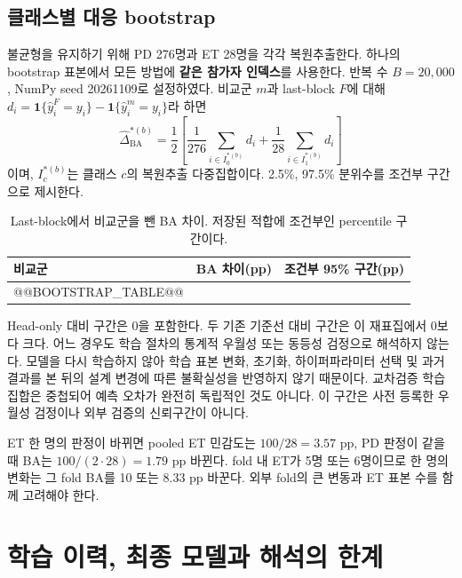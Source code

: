 \documentclass[11pt,a4paper]{article}
\newcommand{\ind}{\mathbf{1}}
\DeclareMathOperator{\BA}{BA}
\begin{document}
\subsection{클래스별 대응 bootstrap}
불균형을 유지하기 위해 PD 276명과 ET 28명을 각각 복원추출한다.
하나의 bootstrap 표본에서 모든 방법에 \textbf{같은 참가자 인덱스}를 사용한다.
반복 수 $B=20{,}000$, NumPy seed 20261109로 설정하였다.
비교군 $m$과 last-block $F$에 대해
$d_i=\ind\{\widehat y_i^{F}=y_i\}-\ind\{\widehat y_i^m=y_i\}$라 하면
\begin{equation}
 \widehat\Delta_{\BA}^{*(b)}=
 \frac12\left[\frac1{276}\sum_{i\in I_{0}^{*(b)}}d_i+
 \frac1{28}\sum_{i\in I_{1}^{*(b)}}d_i\right]
\end{equation}
이며, $I_c^{*(b)}$는 클래스 $c$의 복원추출 다중집합이다.
2.5\%, 97.5\% 분위수를 조건부 구간으로 제시한다.
\begin{table}[H]\centering\small
\caption{Last-block에서 비교군을 뺀 BA 차이. 저장된 적합에 조건부인 percentile 구간이다.}
\begin{tabular}{@{}lrr@{}}\toprule
비교군 & BA 차이(pp) & 조건부 95\% 구간(pp)\\\midrule
@@BOOTSTRAP_TABLE@@
\bottomrule\end{tabular}
\end{table}
Head-only 대비 구간은 0을 포함한다. 두 기존 기준선 대비 구간은 이 재표집에서 0보다 크다.
어느 경우도 학습 절차의 통계적 우월성 또는 동등성 검정으로 해석하지 않는다.
모델을 다시 학습하지 않아 학습 표본 변화, 초기화, 하이퍼파라미터 선택 및
과거 결과를 본 뒤의 설계 변경에 따른 불확실성을 반영하지 않기 때문이다.
교차검증 학습 집합은 중첩되어 예측 오차가 완전히 독립적인 것도 아니다.
이 구간은 사전 등록한 우월성 검정이나 외부 검증의 신뢰구간이 아니다.

ET 한 명의 판정이 바뀌면 pooled ET 민감도는 $100/28=3.57$ pp,
PD 판정이 같을 때 BA는 $100/(2\cdot28)=1.79$ pp 바뀐다.
fold 내 ET가 5명 또는 6명이므로 한 명의 변화는 그 fold BA를 10 또는 8.33 pp 바꾼다.
외부 fold의 큰 변동과 ET 표본 수를 함께 고려해야 한다.
\clearpage

\section{학습 이력, 최종 모델과 해석의 한계}
\end{document}
